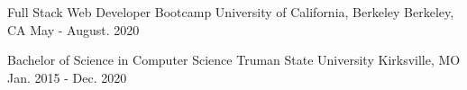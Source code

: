 \vspace{-0.5mm}
\vspace{-0.5mm}

\begin{cventries}
  \cventry
    {Full Stack Web Developer Bootcamp}
    {University of California, Berkeley}
    {Berkeley, CA}
    {May - August. 2020 }    
    {
      \begin{cvitems}
      \end{cvitems}
    }
\end{cventries}
\vspace{-5mm}
\vspace{-5mm}
\begin{cventries}
  \cventry
    {Bachelor of Science in Computer Science}
    {Truman State University}
    {Kirksville, MO}
    {Jan. 2015 - Dec. 2020}    
    {
      \begin{cvitems}
      \end{cvitems}
    }
\end{cventries}
\vspace{-5mm}

 
